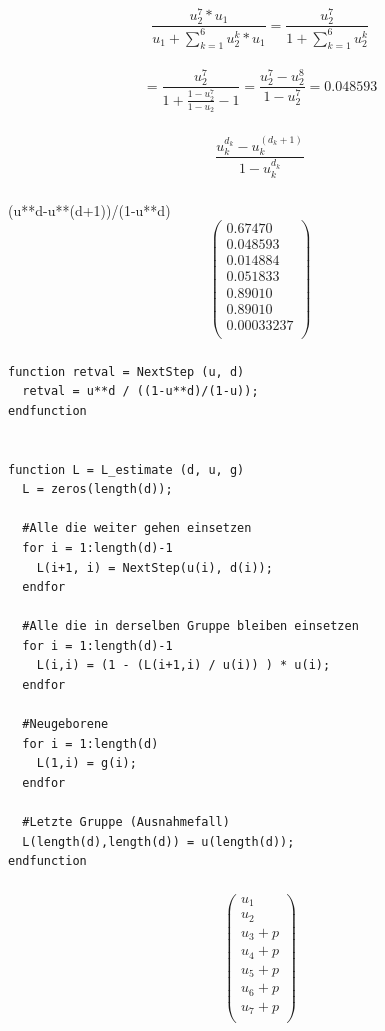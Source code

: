 \documentclass{article}
\begin{document}
\subsubsection{}
\Large {
$$\frac{u_2^7 * u_1}{u_1 + \sum_{k=1}^{6} u_2^k * u_1} 
= \frac{u_2^7}{1 + \sum_{k=1}^{6} u_2^k}$$ \\
$$= \frac{u_2^7}{1 + \frac{1 - u_2^7}{1 - u_2}-1} =
 \frac{u_2^7 - u_2^8}{1-u_2^7} = 0.048593$$
}

\subsubsection{}
\Large {
$$\frac{u_k^{d_k} - u_k^{(d_k+1)}}{1-u_k^{d_k}}$$
}

\subsubsection{}
(u**d-u**(d+1))/(1-u**d)
\[
    \begin{pmatrix}
     0.67470 \\
     0.048593 \\
     0.014884  \\
     0.051833 \\
     0.89010 \\
     0.89010 \\
     0.00033237 \\
    \end{pmatrix}
\]

\subsubsection{}
\normalsize
\begin{lstlisting}
function retval = NextStep (u, d)
  retval = u**d / ((1-u**d)/(1-u));
endfunction


function L = L_estimate (d, u, g)
  L = zeros(length(d));
  
  #Alle die weiter gehen einsetzen
  for i = 1:length(d)-1
    L(i+1, i) = NextStep(u(i), d(i));
  endfor
  
  #Alle die in derselben Gruppe bleiben einsetzen
  for i = 1:length(d)-1
    L(i,i) = (1 - (L(i+1,i) / u(i)) ) * u(i);
  endfor
  
  #Neugeborene
  for i = 1:length(d)
    L(1,i) = g(i);
  endfor
  
  #Letzte Gruppe (Ausnahmefall)
  L(length(d),length(d)) = u(length(d));
endfunction
\end{lstlisting}

\subsubsection{}
\Large
\[
    \begin{pmatrix}
     u_1 \\
     u_2 \\
     u_3 + p  \\
     u_4 + p \\
     u_5 + p \\
     u_6 + p \\
     u_7 + p \\
    \end{pmatrix}
\]
\end{document}
